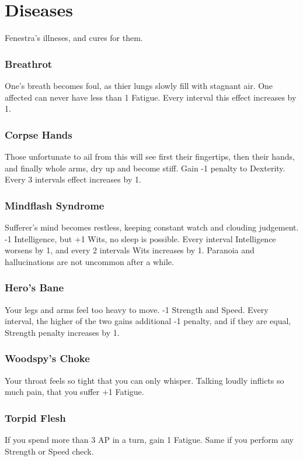 \section{Diseases}

\begin{multicols}{2}

Fenestra's illneses, and cures for them.

\subsubsection{Breathrot}

One's breath becomes foul, as thier lungs slowly fill with stagnant air. One affected can never have less than 1 Fatigue. Every interval this effect increases by 1.

\subsubsection{Corpse Hands}

Those unfortunate to ail from this will see first their fingertips, then their hands, and finally whole arms, dry up and become stiff. Gain -1 penalty to Dexterity. Every 3 intervals effect increases by 1.

\subsubsection{Mindflash Syndrome}

Sufferer's mind becomes restless, keeping constant watch and clouding judgement. -1 Intelligence, but +1 Wits, no sleep is possible. Every interval Intelligence worsens by 1, and every 2 intervals Wits increases by 1. Paranoia and hallucinations are not uncommon after a while.

\subsubsection{Hero's Bane}

Your legs and arms feel too heavy to move. -1 Strength and Speed. Every interval, the higher of the two gains additional -1 penalty, and if they are equal, Strength penalty increases by 1.

\subsubsection{Woodspy's Choke}

Your throat feels so tight that you can only whisper. Talking loudly inflicts so much pain, that you suffer +1 Fatigue.

\subsubsection{Torpid Flesh}

If you spend more than 3 AP in a turn, gain 1 Fatigue. Same if you perform any Strength or Speed check.

\end{multicols}

